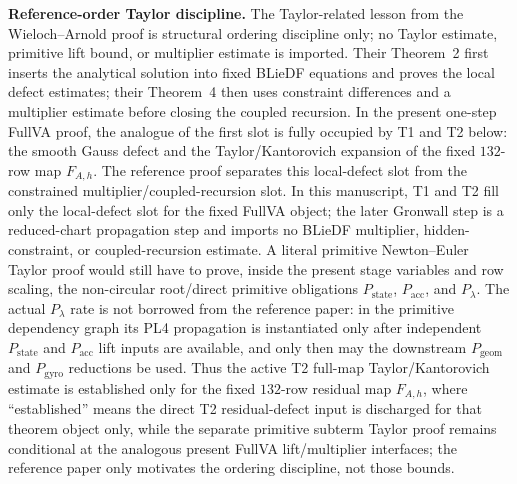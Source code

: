 \documentclass[preprint,12pt]{elsarticle}
\begin{document}
\noindent\textbf{Reference-order Taylor discipline.}
The Taylor-related lesson from the Wieloch--Arnold proof is structural
ordering discipline only; no Taylor estimate, primitive lift bound, or
multiplier estimate is imported.  Their Theorem~2 first inserts the analytical
solution into fixed BLieDF equations and proves the local defect estimates;
their Theorem~4 then uses constraint differences and a multiplier estimate
before closing the coupled recursion.  In the present one-step FullVA proof,
the analogue of the first slot is fully occupied by T1 and T2 below: the
smooth Gauss defect and the Taylor/Kantorovich expansion of the fixed
\(132\)-row map \(F_{A,h}\).  The reference proof separates this local-defect
slot from the constrained multiplier/coupled-recursion slot.  In this
manuscript, T1 and T2 fill only the local-defect slot for the fixed FullVA
object; the later Gronwall step is a reduced-chart propagation step and
imports no BLieDF multiplier, hidden-constraint, or coupled-recursion
estimate.  A literal primitive Newton--Euler Taylor proof would still have to
prove, inside the present stage variables and row scaling, the non-circular
root/direct primitive obligations \(P_{\mathrm{state}}\),
\(P_{\mathrm{acc}}\), and \(P_{\lambda}\).  The actual
\(P_{\lambda}\) rate is not borrowed from the reference paper: in the
primitive dependency graph its PL4 propagation is instantiated only after
independent \(P_{\mathrm{state}}\) and \(P_{\mathrm{acc}}\) lift inputs are
available, and only then may the downstream \(P_{\mathrm{geom}}\) and
\(P_{\mathrm{gyro}}\) reductions be used.  Thus the active
T2 full-map Taylor/Kantorovich estimate is established only for the fixed
\(132\)-row residual map \(F_{A,h}\), where ``established'' means the direct T2
residual-defect input is discharged for that theorem object only, while the
separate primitive subterm
Taylor proof remains conditional at the analogous present FullVA
lift/multiplier interfaces; the reference paper only motivates the ordering
discipline, not those bounds.
\end{document}
